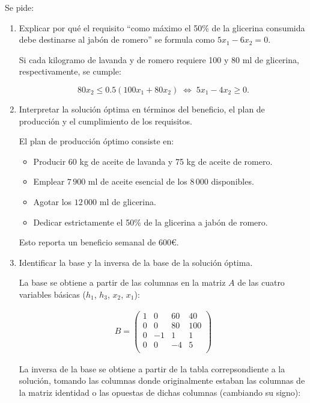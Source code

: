 Se pide:
\begin{enumerate}[label=\alph*)]
    \item Explicar por qué el requisito ``como máximo el 50\% de la glicerina consumida debe destinarse al jabón de romero'' se formula como $5x_1 - 6x_2 = 0$.

    Si cada kilogramo de lavanda y de romero requiere 100 y 80 ml de glicerina, respectivamente, se cumple:
    
    \[
    80x_2 \le 0.5(100x_1 + 80x_2)
    \;\Longleftrightarrow\;
    5x_1 - 4x_2 \ge 0.
    \]
    

    \item Interpretar la solución óptima en términos del beneficio, el plan de producción y el cumplimiento de los requisitos.

        El plan de producción óptimo consiste en:

    \begin{itemize}
        \item Producir 60 kg de aceite de lavanda y 75 kg de aceite de romero. 
        \item Emplear $7\,900$ ml de aceite esencial de los $8\,000$ disponibles.
        \item Agotar los $12\,000$ ml de glicerina.
        \item Dedicar estrictamente el 50\% de la glicerina a jabón de romero.
    \end{itemize}

    Esto reporta un beneficio semanal de 600€.
    
    \item Identificar la base y la inversa de la base de la solución óptima.

    La base se obtiene a partir de las columnas en la matriz $A$ de las cuatro variables básicas ($h_1$, $h_3$, $x_2$, $x_1$): 

    \begin{equation}
    \begin{split}
    B =\begin{pmatrix}
    1 & 0 & 60 & 40\\
    0 & 0 & 80 & 100\\
    0 & -1 & 1 & 1\\
    0 & 0 & -4 & 5\\
    \end{pmatrix}
    \end{split}
    \end{equation}

    La inversa de la base se obtiene a partir de la tabla correpsondiente a la solución, tomando las columnas donde originalmente estaban las columnas de la matriz identidad o las opuestas de dichas columnas (cambiando su signo):


\end{enumerate}
